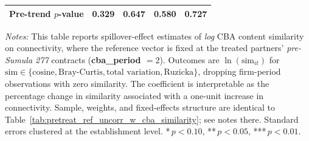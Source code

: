 \begin{table}[H]
\begin{tabular}{lcccc}
Pre-trend $p$-value & 0.329 & 0.647 & 0.580 & 0.727 \\
\hline\hline
\end{tabular}
\begin{minipage}{\linewidth}
\smallskip
\scriptsize\textit{Notes:} This table reports spillover-effect estimates of \emph{log} CBA content similarity on connectivity, where the reference vector is fixed at the treated partners' \textit{pre-Sumula 277} contracts (\textbf{cba\_period $= 2$}). Outcomes are $\ln(\text{sim}_{it})$ for $\text{sim} \in \{\text{cosine}, \text{Bray-Curtis}, \text{total variation}, \text{Ruzicka}\}$, dropping firm-period observations with zero similarity. The coefficient is interpretable as the percentage change in similarity associated with a one-unit increase in connectivity. Sample, weights, and fixed-effects structure are identical to Table~\ref{tab:pretreat_ref_uncorr_w_cba_similarity}; see notes there. Standard errors clustered at the establishment level. *\,$p<0.10$, **\,$p<0.05$, ***\,$p<0.01$.
\end{minipage}
\end{table}

